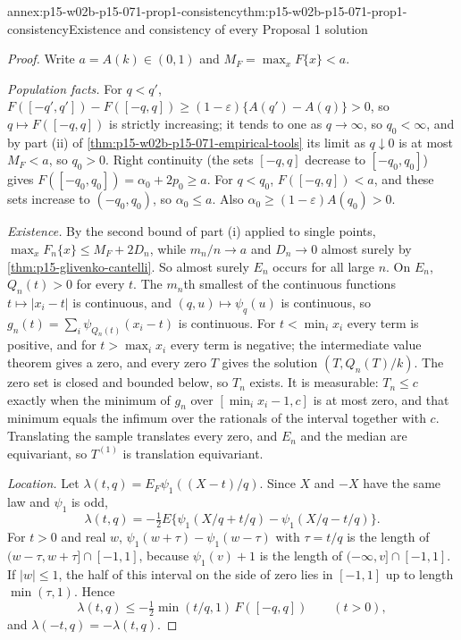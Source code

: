 \begin{annexitem}{annex:p15-w02b-p15-071-prop1-consistency}{thm:p15-w02b-p15-071-prop1-consistency}{Existence and consistency of every Proposal 1 solution}
\begin{proof}
Write \(a=A(k)\in(0,1)\) and \(M_F=\max_xF\{x\}<a\).

\emph{Population facts.} For \(q<q'\),
\(F([-q',q'])-F([-q,q])\geq(1-\varepsilon)\{A(q')-A(q)\}>0\), so
\(q\mapsto F([-q,q])\) is strictly increasing; it tends to one as
\(q\to\infty\), so \(q_0<\infty\), and by part (ii) of
\cref{thm:p15-w02b-p15-071-empirical-tools} its limit as
\(q\downarrow0\) is at most \(M_F<a\), so \(q_0>0\). Right continuity
(the sets \([-q,q]\) decrease to \([-q_0,q_0]\)) gives
\(F([-q_0,q_0])=\alpha_0+2p_0\geq a\). For \(q<q_0\),
\(F([-q,q])<a\), and these sets increase to \((-q_0,q_0)\), so
\(\alpha_0\leq a\). Also \(\alpha_0\geq(1-\varepsilon)A(q_0)>0\).

\emph{Existence.} By the second bound of part (i) applied to single
points, \(\max_xF_n\{x\}\leq M_F+2D_n\), while \(m_n/n\to a\) and
\(D_n\to0\) almost surely by \cref{thm:p15-glivenko-cantelli}. So
almost surely \(E_n\) occurs for all large \(n\). On \(E_n\),
\(Q_n(t)>0\) for every \(t\). The \(m_n\)th smallest of the continuous
functions \(t\mapsto|x_i-t|\) is continuous, and \((q,u)\mapsto\psi_q(u)\)
is continuous, so \(g_n(t)=\sum_i\psi_{Q_n(t)}(x_i-t)\) is continuous.
For \(t<\min_ix_i\) every term is positive, and for \(t>\max_ix_i\)
every term is negative; the intermediate value theorem gives a zero,
and every zero \(T\) gives the solution \((T,Q_n(T)/k)\). The zero set
is closed and bounded below, so \(T_n\) exists. It is measurable:
\(T_n\leq c\) exactly when the minimum of \(g_n\) over
\([\min_ix_i-1,c]\) is at most zero, and that minimum equals the
infimum over the rationals of the interval together with \(c\).
Translating the sample translates every zero, and \(E_n\) and the
median are equivariant, so \(T^{(1)}\) is translation equivariant.

\emph{Location.} Let \(\lambda(t,q)=E_F\psi_1((X-t)/q)\). Since \(X\)
and \(-X\) have the same law and \(\psi_1\) is odd,
\[
 \lambda(t,q)=-\tfrac12E\{\psi_1(X/q+t/q)-\psi_1(X/q-t/q)\}.
\]
For \(t>0\) and real \(w\), \(\psi_1(w+\tau)-\psi_1(w-\tau)\) with
\(\tau=t/q\) is the length of \((w-\tau,w+\tau]\cap[-1,1]\), because
\(\psi_1(v)+1\) is the length of \((-\infty,v]\cap[-1,1]\). If
\(|w|\leq1\), the half of this interval on the side of zero lies in
\([-1,1]\) up to length \(\min(\tau,1)\). Hence
\[
 \lambda(t,q)\leq-\tfrac12\min(t/q,1)\,F([-q,q])\qquad(t>0),
\]
and \(\lambda(-t,q)=-\lambda(t,q)\).


\end{proof}
\end{annexitem}

